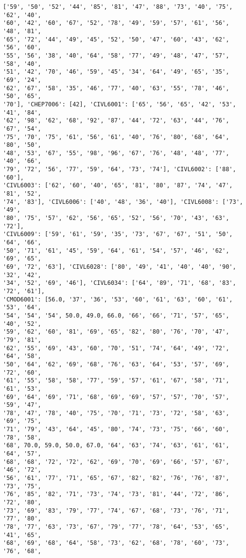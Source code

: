 \documentclass[11pt]{article}
\begin{document}
\begin{Verbatim}[commandchars=\\\{\}]
['59', '50', '52', '44', '85', '81', '47', '88', '73', '40', '75', '62', '40',
'60', '42', '60', '67', '52', '78', '49', '59', '57', '61', '56', '48', '81',
'65', '72', '44', '49', '45', '52', '50', '47', '60', '43', '62', '56', '60',
'55', '56', '38', '40', '64', '58', '77', '49', '48', '47', '57', '58', '40',
'51', '42', '70', '46', '59', '45', '34', '64', '49', '65', '35', '69', '24',
'62', '67', '58', '35', '46', '77', '40', '63', '55', '78', '46', '50', '65',
'70'], 'CHEP7006': [42], 'CIVL6001': ['65', '56', '65', '42', '53', '41', '84',
'62', '98', '62', '68', '92', '87', '44', '72', '63', '44', '76', '67', '54',
'75', '70', '75', '61', '56', '61', '40', '76', '80', '68', '64', '80', '50',
'48', '53', '67', '55', '98', '96', '67', '76', '48', '48', '77', '40', '66',
'79', '72', '56', '77', '59', '64', '73', '74'], 'CIVL6002': ['88', '60'],
'CIVL6003': ['62', '60', '40', '65', '81', '80', '87', '74', '47', '81', '52',
'74', '83'], 'CIVL6006': ['40', '48', '36', '40'], 'CIVL6008': ['73', '49',
'80', '75', '57', '62', '56', '65', '52', '56', '70', '43', '63', '72'],
'CIVL6009': ['59', '61', '59', '35', '73', '67', '67', '51', '50', '64', '66',
'50', '71', '61', '45', '59', '64', '61', '54', '57', '46', '62', '69', '65',
'69', '72', '63'], 'CIVL6028': ['80', '49', '41', '40', '40', '90', '32', '42',
'34', '52', '69', '46'], 'CIVL6034': ['64', '89', '71', '68', '83', '72', '61'],
'CMOD6001': [56.0, '37', '36', '53', '60', '61', '63', '60', '61', '53', '64',
'54', '54', '54', 50.0, 49.0, 66.0, '66', '66', '71', '57', '65', '40', '52',
'59', '62', '60', '81', '69', '65', '82', '80', '76', '70', '47', '79', '81',
'62', '55', '69', '43', '60', '70', '51', '74', '64', '49', '72', '64', '58',
'50', '64', '62', '69', '68', '76', '63', '64', '53', '57', '69', '72', '60',
'61', '55', '58', '58', '77', '59', '57', '61', '67', '58', '71', '61', '53',
'69', '64', '69', '71', '68', '69', '69', '57', '57', '70', '57', '59', '47',
'78', '47', '78', '40', '75', '70', '71', '73', '72', '58', '63', '69', '75',
'71', '79', '43', '64', '45', '80', '74', '73', '75', '66', '60', '78', '58',
'68', 70.0, 59.0, 50.0, 67.0, '64', '63', '74', '63', '61', '61', '64', '57',
'68', '68', '72', '72', '62', '69', '70', '69', '66', '57', '67', '46', '72',
'56', '61', '77', '71', '65', '67', '82', '82', '76', '76', '87', '73', '75',
'76', '85', '82', '71', '73', '74', '73', '81', '44', '72', '86', '72', '80',
'73', '69', '83', '79', '77', '74', '67', '68', '73', '76', '71', '77', '80',
'78', '77', '63', '73', '67', '79', '77', '78', '64', '53', '65', '41', '65',
'68', '69', '68', '64', '58', '73', '62', '68', '78', '60', '73', '76', '68',

\end{Verbatim}
\end{document}
